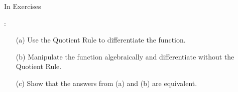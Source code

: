 {\noindent In Exercises}
{:
\begin{enumerate}
\item[(a)] Use the Quotient Rule to differentiate the function.
\item[(b)] Manipulate the function algebraically and differentiate without the Quotient Rule.
\item[(c)] Show that the answers from (a) and (b) are equivalent.
\end{enumerate}
}
